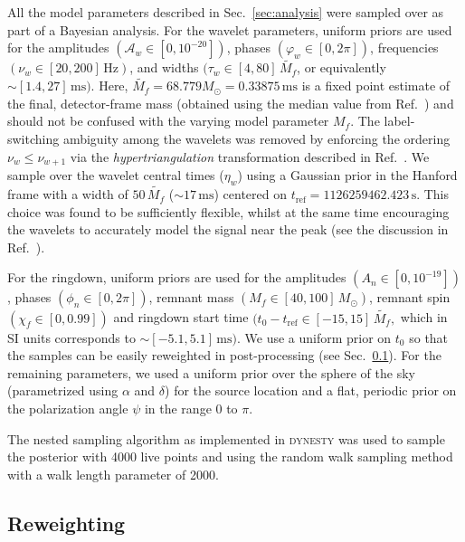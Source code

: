 All the model parameters described in Sec.~\ref{sec:analysis} were sampled over as part of a Bayesian analysis.
For the wavelet parameters, uniform priors are used for the amplitudes $(\mathcal{A}_w \in [0,10^{-20}])$, phases $(\varphi_w \in [0,2\pi])$, frequencies $(\nu_w \in [20,200]\, \mathrm{Hz})$, and widths $(\tau_w \in [4,80]\, \tilde{M_f}$, or equivalently $\sim[1.4,27]\, \mathrm{ms})$.
Here, $\tilde{M_f}=68.779M_\odot=0.33875\,\mathrm{ms}$ is a fixed point estimate of the final, detector-frame mass (obtained using the median value from Ref.~\cite{LIGOScientific:2018mvr}) and should not be confused with the varying model parameter $M_f$.
The label-switching ambiguity among the wavelets was removed by enforcing the ordering 
$ \nu_w \leq \nu_{w+1} $ via the \emph{hypertriangulation} transformation described in Ref.~\cite{Buscicchio:2019rir}.
We sample over the wavelet central times ($\eta_w$) using a Gaussian prior in the Hanford frame with a width of $50\,\tilde{M_f}$ ($\sim 17\,\mathrm{ms}$) centered on $t_\mathrm{ref} = 1126259462.423\,\mathrm{s}$.
This choice was found to be sufficiently flexible, whilst at the same time encouraging the wavelets to accurately model the signal near the peak (see the discussion in Ref.~\cite{Finch:2021qph}).

For the ringdown, uniform priors are used for the amplitudes $(A_n \in [0,10^{-19}])$, phases $(\phi_n \in [0,2\pi])$, remnant mass $(M_f \in [40,100]\,M_\odot )$, remnant spin $(\chi_f \in [0,0.99])$ and ringdown start time $(t_0-t_\mathrm{ref} \in [-15, 15]\,\tilde{M_f},$ which in SI units corresponds to $\sim[-5.1,5.1]\, \mathrm{ms})$.
We use a uniform prior on $t_0$ so that the samples can be easily reweighted in post-processing (see Sec.~\ref{subsec:reweighting}). 
For the remaining parameters, we used a uniform prior over the sphere of the sky (parametrized using $\alpha$ and $\delta$) for the source location and a flat, periodic prior on the polarization angle $\psi$ in the range $0$ to $\pi$.

The nested sampling \cite{Skilling:2006gxv} algorithm as implemented in \textsc{dynesty} \cite{Speagle:2019ivv} was used to sample the posterior with 4000 live points and using the random walk sampling method with a walk length parameter of 2000.


\subsection{Reweighting} \label{subsec:reweighting}

